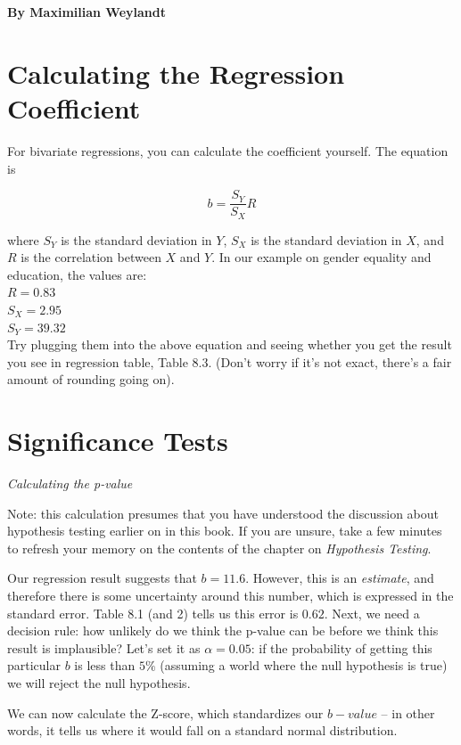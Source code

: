 \documentclass{book}
\begin{document}
\textbf{By Maximilian Weylandt}

\hypertarget{calculating-the-regression-coefficient}{%
\section{Calculating the Regression
Coefficient}\label{calculating-the-regression-coefficient}}

For bivariate regressions, you can calculate the coefficient yourself. The
equation is

\[b = \frac{S_Y}{S_X}R\]

where \(S_Y\) is the standard deviation in \(Y\), \(S_X\) is the standard
deviation in \(X\), and \(R\) is the correlation between \(X\) and \(Y\). In
our example on gender equality and education, the values are:\\
\(R = 0.83\)\\
\(S_X = 2.95\)\\
\(S_Y = 39.32\)\\
Try plugging them into the above equation and seeing whether you get the
result you see in regression table, Table 8.3. (Don't worry if it's not exact,
there's a fair amount of rounding going on).

\hypertarget{significance-tests-1}{%
\section{Significance Tests}\label{significance-tests-1}}

\emph{Calculating the p-value}

Note: this calculation presumes that you have understood the discussion about
hypothesis testing earlier on in this book. If you are unsure, take a few
minutes to refresh your memory on the contents of the chapter on
\emph{Hypothesis Testing}.

Our regression result suggests that \(b=11.6\). However, this is an
\emph{estimate}, and therefore there is some uncertainty around this number,
which is expressed in the standard error. Table 8.1 (and 2) tells us this
error is \(0.62\). Next, we need a decision rule: how unlikely do we think the
p-value can be before we think this result is implausible? Let's set it as
\(\alpha=0.05\): if the probability of getting this particular \(b\) is less
than \(5\%\) (assuming a world where the null hypothesis is true) we will
reject the null hypothesis.

We can now calculate the Z-score, which standardizes our \(b-value\) -- in
other words, it tells us where it would fall on a standard normal
distribution.
\end{document}
